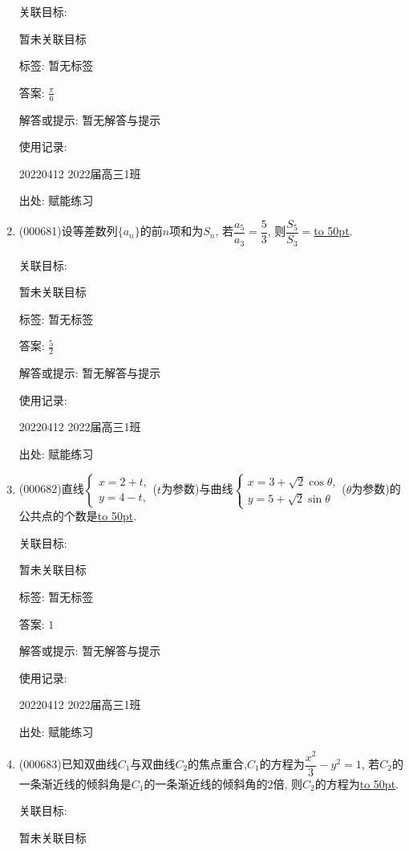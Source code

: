 \documentclass[10pt,a4paper]{article}
\newcommand{\blank}[1]{\underline{\hbox to #1pt{}}}
\begin{document}
\begin{enumerate}[1.]
关联目标:

暂未关联目标



标签: 暂无标签

答案: $\frac{\pi}6$

解答或提示: 暂无解答与提示

使用记录:

20220412	2022届高三1班	


出处: 赋能练习
\item { (000681)}设等差数列$\{a_n\}$的前$n$项和为$S_n$, 若$\dfrac{a_5}{a_3}=\dfrac53$, 则$\dfrac{S_5}{S_3}=$\blank{50}.


关联目标:

暂未关联目标



标签: 暂无标签

答案: $\frac 52$

解答或提示: 暂无解答与提示

使用记录:

20220412	2022届高三1班	


出处: 赋能练习
\item { (000682)}直线$\begin{cases} x=2+t, \\ y=4-t,\end{cases}$($t$为参数)与曲线$\begin{cases} x=3+\sqrt2\cos\theta, \\ y=5+\sqrt2\sin\theta \end{cases}$($\theta$为参数)的公共点的个数是\blank{50}.


关联目标:

暂未关联目标



标签: 暂无标签

答案: $1$

解答或提示: 暂无解答与提示

使用记录:

20220412	2022届高三1班	


出处: 赋能练习
\item { (000683)}已知双曲线$C_1$与双曲线$C_2$的焦点重合,$C_1$的方程为$\dfrac{x^2}3-{y^2}=1$, 若$C_2$的一条渐近线的倾斜角是$C_1$的一条渐近线的倾斜角的$2$倍, 则$C_2$的方程为\blank{50}.


关联目标:

暂未关联目标




\end{enumerate}
\end{document}
